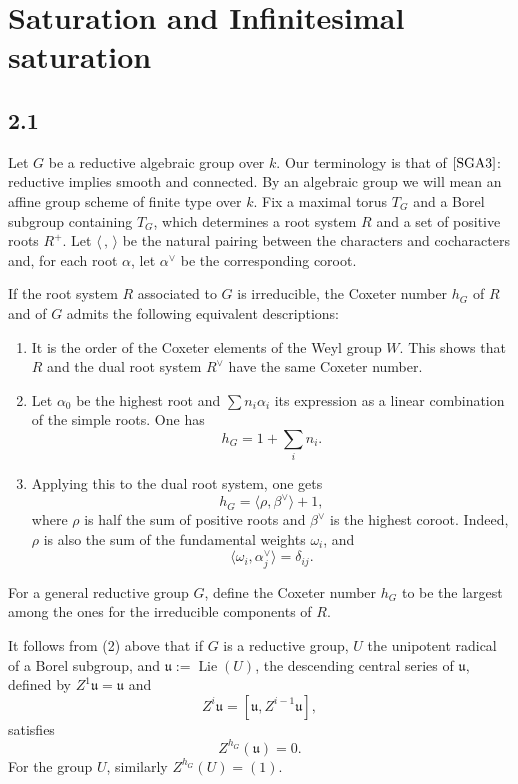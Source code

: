 \documentclass[11pt]{article}
\newcommand{\Lie}{\operatorname{Lie}}
\begin{document}
\section{Saturation and Infinitesimal saturation}

\subsection*{2.1}

Let \(G\) be a reductive algebraic group over \(k\). Our terminology is that of
\([{\rm SGA3}]\): reductive implies smooth and connected. By an algebraic group we
will mean an affine group scheme of finite type over \(k\). Fix a maximal torus
\(T_G\) and a Borel subgroup containing \(T_G\), which determines a root system \(R\)
and a set of positive roots \(R^+\). Let \(\langle\, ,\,\rangle\) be the natural pairing
between the characters and cocharacters and, for each root \(\alpha\), let
\(\alpha^\vee\) be the corresponding coroot.

If the root system \(R\) associated to \(G\) is irreducible, the Coxeter number
\(h_G\) of \(R\) and of \(G\) admits the following equivalent descriptions:
\begin{enumerate}[label=(\arabic*),leftmargin=2em]
\item It is the order of the Coxeter elements of the Weyl group \(W\). This shows
that \(R\) and the dual root system \(R^\vee\) have the same Coxeter number.
\item Let \(\alpha_0\) be the highest root and \(\sum n_i\alpha_i\) its expression as
a linear combination of the simple roots. One has
\[
  h_G=1+\sum_i n_i. \tag{2.1.1}
\]
\item Applying this to the dual root system, one gets
\[
  h_G=\langle \rho,\beta^\vee\rangle+1,
\]
where \(\rho\) is half the sum of positive roots and \(\beta^\vee\) is the highest
coroot. Indeed, \(\rho\) is also the sum of the fundamental weights \(\omega_i\), and
\[
  \langle \omega_i,\alpha_j^\vee\rangle=\delta_{ij}.
\]
\end{enumerate}

For a general reductive group \(G\), define the Coxeter number \(h_G\) to be the largest
among the ones for the irreducible components of \(R\).

It follows from (2) above that if \(G\) is a reductive group, \(U\) the unipotent radical
of a Borel subgroup, and \(\mathfrak u:=\Lie(U)\), the descending central series of
\(\mathfrak u\), defined by \(Z^1\mathfrak u=\mathfrak u\) and
\[
  Z^i\mathfrak u=[\mathfrak u,Z^{i-1}\mathfrak u],
\]
satisfies
\[
  Z^{h_G}(\mathfrak u)=0. \tag{2.1.2}
\]
For the group \(U\), similarly \(Z^{h_G}(U)=(1)\).
\end{document}
